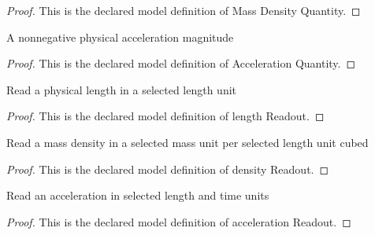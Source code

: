 \begin{proof}
  This is the declared model definition of Mass Density Quantity.
\end{proof}
\begin{definition}
  \label{def:physics:phyx-mini-0391:phyxminiproblems-problemphyxmini0391-accelerationquantity}
  A nonnegative physical acceleration magnitude
\end{definition}
\begin{proof}
  This is the declared model definition of Acceleration Quantity.
\end{proof}
\begin{definition}
  \label{def:physics:phyx-mini-0391:phyxminiproblems-problemphyxmini0391-lengthreadout}
  Read a physical length in a selected length unit
\end{definition}
\begin{proof}
  This is the declared model definition of length Readout.
\end{proof}
\begin{definition}
  \label{def:physics:phyx-mini-0391:phyxminiproblems-problemphyxmini0391-densityreadout}
  Read a mass density in a selected mass unit per selected length unit cubed
\end{definition}
\begin{proof}
  This is the declared model definition of density Readout.
\end{proof}
\begin{definition}
  \label{def:physics:phyx-mini-0391:phyxminiproblems-problemphyxmini0391-accelerationreadout}
  Read an acceleration in selected length and time units
\end{definition}
\begin{proof}
  This is the declared model definition of acceleration Readout.
\end{proof}
